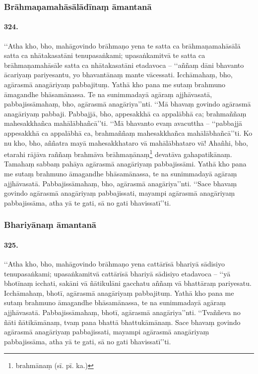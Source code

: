 \subsubsection{Brāhmaṇamahāsālādīnaṃ āmantanā}

\paragraph{324.} ‘‘Atha kho, bho, mahāgovindo brāhmaṇo yena te satta ca brāhmaṇamahāsālā satta ca nhātakasatāni tenupasaṅkami; upasaṅkamitvā te satta ca brāhmaṇamahāsāle satta ca nhātakasatāni etadavoca – ‘‘aññaṃ dāni bhavanto ācariyaṃ pariyesantu, yo bhavantānaṃ mante vācessati. Icchāmahaṃ, bho, agārasmā anagāriyaṃ pabbajituṃ. Yathā kho pana me sutaṃ brahmuno āmagandhe bhāsamānassa. Te na sunimmadayā agāraṃ ajjhāvasatā, pabbajissāmahaṃ, bho, agārasmā anagāriya’’nti. ‘‘Mā bhavaṃ govindo agārasmā anagāriyaṃ pabbaji. Pabbajjā, bho, appesakkhā ca appalābhā ca; brahmaññaṃ mahesakkhañca mahālābhañcā’’ti. ‘‘Mā bhavanto evaṃ avacuttha – ‘‘pabbajjā appesakkhā ca appalābhā ca, brahmaññaṃ mahesakkhañca mahālābhañcā’’ti. Ko nu kho, bho, aññatra mayā mahesakkhataro vā mahālābhataro vā! Ahañhi, bho, etarahi rājāva raññaṃ brahmāva brāhmaṇānaṃ\footnote{brahmānaṃ (sī. pī. ka.)} devatāva gahapatikānaṃ. Tamahaṃ sabbaṃ pahāya agārasmā anagāriyaṃ pabbajissāmi. Yathā kho pana me sutaṃ brahmuno āmagandhe bhāsamānassa, te na sunimmadayā agāraṃ ajjhāvasatā. Pabbajissāmahaṃ, bho, agārasmā anagāriya’’nti. ‘‘Sace bhavaṃ govindo agārasmā anagāriyaṃ pabbajissati, mayampi agārasmā anagāriyaṃ pabbajissāma, atha yā te gati, sā no gati bhavissatī’’ti.

\subsubsection{Bhariyānaṃ āmantanā}

\paragraph{325.} ‘‘Atha kho, bho, mahāgovindo brāhmaṇo yena cattārīsā bhariyā sādisiyo tenupasaṅkami; upasaṅkamitvā cattārīsā bhariyā sādisiyo etadavoca – ‘‘yā bhotīnaṃ icchati, sakāni vā ñātikulāni gacchatu aññaṃ vā bhattāraṃ pariyesatu. Icchāmahaṃ, bhotī, agārasmā anagāriyaṃ pabbajituṃ. Yathā kho pana me sutaṃ brahmuno āmagandhe bhāsamānassa, te na sunimmadayā agāraṃ ajjhāvasatā. Pabbajissāmahaṃ, bhotī, agārasmā anagāriya’’nti. ‘‘Tvaññeva no ñāti ñātikāmānaṃ, tvaṃ pana bhattā bhattukāmānaṃ. Sace bhavaṃ govindo agārasmā anagāriyaṃ pabbajissati, mayampi agārasmā anagāriyaṃ pabbajissāma, atha yā te gati, sā no gati bhavissatī’’ti.

